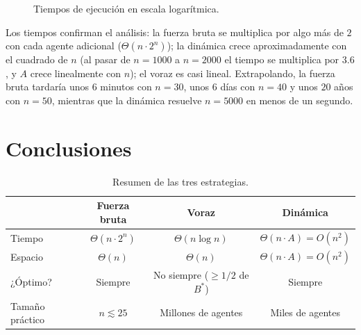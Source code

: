 \documentclass[11pt,letterpaper]{article}
\begin{document}
\begin{figure}[h]
\centering
{}
\caption{Tiempos de ejecución en escala logarítmica.}
\label{fig:tiempos}
\end{figure}

Los tiempos confirman el análisis: la fuerza bruta se multiplica por algo
más de $2$ con cada agente adicional ($\Theta(n\cdot 2^n)$); la dinámica
crece aproximadamente con el cuadrado de $n$ (al pasar de $n=1000$ a
$n=2000$ el tiempo se multiplica por $3.6$, y $A$ crece linealmente con $n$);
el voraz es casi lineal. Extrapolando, la fuerza bruta tardaría unos $6$
minutos con $n = 30$, unos $6$ días con $n = 40$ y unos $20$ años con $n = 50$,
mientras que la dinámica resuelve $n = 5000$ en menos de un segundo.

\section{Conclusiones}

\begin{table}[h]
\centering
\begin{tabular}{lccc}
\toprule
 & Fuerza bruta & Voraz & Dinámica \\
\midrule
Tiempo  & $\Theta(n\cdot 2^n)$ & $\Theta(n\log n)$ & $\Theta(n\cdot A) = O(n^2)$ \\
Espacio & $\Theta(n)$ & $\Theta(n)$ & $\Theta(n\cdot A) = O(n^2)$ \\
¿Óptimo? & Siempre & No siempre ($\ge 1/2$ de $B^*$) & Siempre \\
Tamaño práctico & $n \lesssim 25$ & Millones de agentes & Miles de agentes \\
\bottomrule
\end{tabular}
\caption{Resumen de las tres estrategias.}
\end{table}
\end{document}
